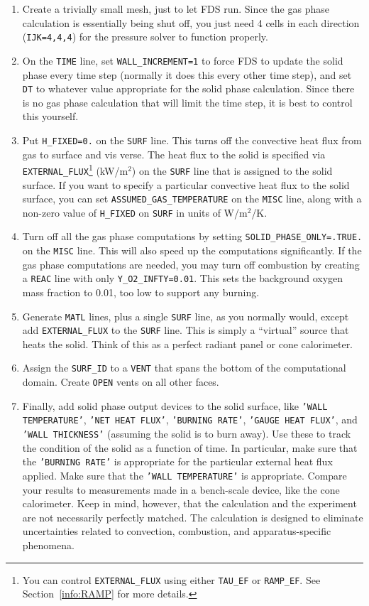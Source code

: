 \documentclass[11pt]{book}
\newcommand{\ct}{\tt\small}
\begin{document}
\begin{enumerate}
\item Create a trivially small mesh, just to let FDS run. Since the
gas phase calculation is essentially being shut off, you just need 4
cells in each direction ({\ct IJK=4,4,4}) for the pressure solver to
function properly.
\item On the {\ct TIME} line, set {\ct WALL\_INCREMENT=1} to force FDS
to update the solid phase every time step (normally it does this every
other time step), and set {\ct DT} to whatever value appropriate for
the solid phase calculation. Since there is no gas phase calculation
that will limit the time step, it is best to control this yourself.
\item Put {\ct H\_FIXED=0.} on the {\ct SURF} line. This turns off the
convective heat flux from gas to surface and vis verse. The heat flux
to the solid is specified via {\ct EXTERNAL\_FLUX}\footnote{You can control {\ct EXTERNAL\_FLUX} using
either {\ct TAU\_EF} or {\ct RAMP\_EF}. See Section~\ref{info:RAMP} for more details.} (kW/m$^2$) on the
{\ct SURF} line that is assigned to the solid surface. If you want to specify a particular
convective heat flux to the solid surface, you can set {\ct ASSUMED\_GAS\_TEMPERATURE} on the
{\ct MISC} line, along with a non-zero value of {\ct H\_FIXED} on {\ct SURF} in units of W/m$^2$/K.
\item Turn off all the gas phase computations by setting {\ct SOLID\_PHASE\_ONLY=.TRUE.}
on the {\ct MISC} line. This will also speed
up the computations significantly. If the gas phase computations are
needed, you may turn off combustion by creating a {\ct REAC} line with only
{\ct Y\_O2\_INFTY=0.01}. This sets the background oxygen mass fraction
to 0.01, too low to support any burning.
\item Generate {\ct MATL} lines, plus a single {\ct SURF} line, as you
normally would, except add {\ct EXTERNAL\_FLUX} to the {\ct SURF}
line. This is simply a ``virtual'' source that heats the solid. Think
of this as a perfect radiant panel or cone calorimeter.
\item Assign the {\ct SURF\_ID} to a {\ct VENT} that spans the bottom
of the computational domain. Create {\ct OPEN} vents on all other
faces.
\item Finally, add solid phase output devices to the solid surface,
like {\ct 'WALL TEMPERATURE'}, {\ct 'NET HEAT FLUX'}, {\ct 'BURNING RATE'},
{\ct 'GAUGE HEAT FLUX'}, and {\ct 'WALL THICKNESS'} (assuming the solid
is to burn away). Use these to track the condition of the solid as a
function of time. In particular, make sure that the {\ct 'BURNING RATE'} is appropriate for the particular external heat flux
applied. Make sure that the {\ct 'WALL TEMPERATURE'} is
appropriate. Compare your results to measurements made in a
bench-scale device, like the cone calorimeter. Keep in mind, however,
that the calculation and the experiment are not necessarily perfectly
matched. The calculation is designed to eliminate uncertainties
related to convection, combustion, and apparatus-specific phenomena.
\end{enumerate}
\end{document}
